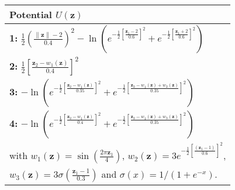 \begin{tabular}{@{}l@{}}
\toprule
\textbf{Potential} $U(\mathbf{z})$ \\ \midrule\midrule
\textbf{1:} $\frac{1}{2}\left(\frac{\|\mathbf{z}\|-2}{0.4}\right)^{2}-\ln \left(e^{-\frac{1}{2}\left[\frac{\mathbf{z}_{1}-2}{0.6}\right]^{2}}+e^{-\frac{1}{2}\left[\frac{\mathbf{z}_{1}+2}{0.6}\right]^{2}}\right)$ \\
\textbf{2:} $\frac{1}{2}\left[\frac{\mathbf{z}_{2}-w_{1}(\mathbf{z})}{0.4}\right]^{2}$ \\
\textbf{3:} $-\ln \left(e^{-\frac{1}{2}\left[\frac{\mathbf{z}_{2}-w_{1}(\mathbf{z})}{0.35}\right]^{2}}+e^{-\frac{1}{2}\left[\frac{\mathbf{z}_{2}-w_{1}(\mathbf{z})+w_{2}(\mathbf{z})}{0.35}\right]^{2}}\right)$ \\
\textbf{4:} $-\ln \left(e^{-\frac{1}{2}\left[\frac{\mathbf{z}_{2}-w_{1}(\mathbf{z})}{0.4}\right]^{2}}+e^{-\frac{1}{2}\left[\frac{\mathbf{z}_{2}-w_{1}(\mathbf{z})+w_{3}(\mathbf{z})}{0.35}\right]^{2}}\right)$ \\ \midrule
 with $w_1(\mathbf{z}) = \sin\left(\frac{2 \pi \mathbf{z}_1}{4}\right)$,
      $w_2(\mathbf{z}) = 3 e^{-\frac{1}{2} \left[ \frac{(\mathbf{z}_1 - 1)}{0.6} \right]^2}$,\\
     $w_3(\mathbf{z}) = 3 \sigma \left( \frac{\mathbf{z}_1-1}{0.3} \right)$ and $\sigma(x) = 1 / (1 + e^{-x})$.  \\ \midrule           
\end{tabular}